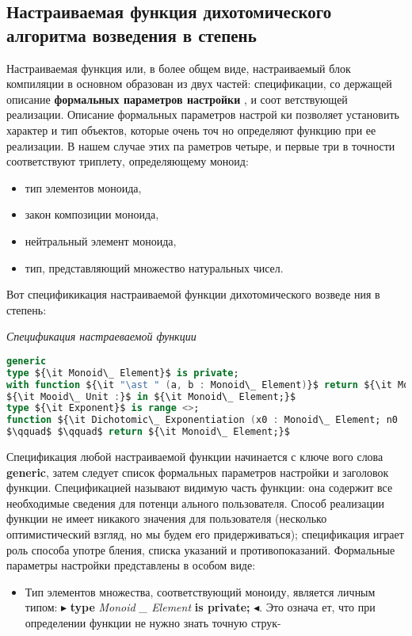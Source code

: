 \subsection{ Настраиваемая функция дихотомического алгоритма возведения в степень}

\noindent Настраиваемая функция или, в более общем виде, настраиваемый блок
компиляции в основном образован из двух частей: спецификации, со­
держащей описание {\bf формальных параметров настройки} , и соот­
ветствующей реализации. Описание формальных параметров настрой­
ки позволяет установить характер и тип объектов, которые очень точ­
но определяют функцию при ее реализации. В нашем случае этих па­
раметров четыре, и первые три в точности соответствуют триплету,
определяющему моноид:
\begin{itemize}
\item тип элементов моноида,
\item закон композиции моноида,
\item нейтральный элемент моноида,
\item тип, представляющий множество натуральных чисел.
\end{itemize}
\noindent Вот спецификикация настраиваемой функции дихотомического возведе­
ния в степень:
\begin{center}
\parbox{8cm}{
{\it {\small Спецификация настраеваемой функции}}}
\end{center}
\begin{lstlisting}[mathescape=true, language=Ada, basicstyle=\small]
generic
type ${\it Monoid\_ Element}$ is private;
with function ${\it "\ast " (a, b : Monoid\_ Element)}$ return ${\it Monoid\_ Element;}$
${\it Mooid\_ Unit :}$ in ${\it Monoid\_ Element;}$
type ${\it Exponent}$ is range <>;
function ${\it Dichotomic\_ Exponentiation (x0 : Monoid\_ Element; n0 : exponent)}$
$\qquad$ $\qquad$ return ${\it Monoid\_ Element;}$
\end{lstlisting}

Спецификация любой настраиваемой функции начинается с ключе­
вого слова {\bf generic}, затем следует список формальных параметров
настройки и заголовок функции. Спецификацией называют видимую
часть функции: она содержит все необходимые сведения для потенци­
ального пользователя. Способ реализации функции не имеет никакого
значения для пользователя (несколько оптимистический взгляд, но мы
будем его придерживаться); спецификация играет роль способа употре­
бления, списка указаний и противопоказаний. Формальные параметры
настройки представлены в особом виде:
\begin{itemize}
\item Тип элементов множества, соответствующий моноиду, является
личным типом: $\blacktriangleright$ {\bf type} {\it Monoid \_  Element} {\bf is private;} $\blacktriangleleft$. Это означа­
ет, что при определении функции не нужно знать точную струк-
\end{itemize}

